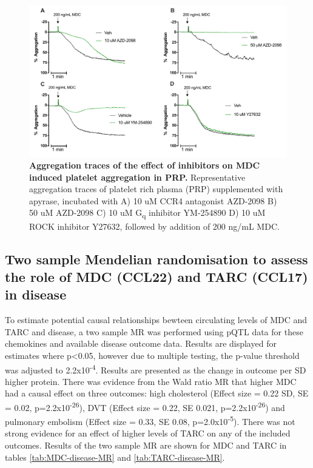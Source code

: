 \documentclass[11pt,twoside]{bristolthesis}
\begin{document}
\begin{figure}
\includegraphics[width=0.95\linewidth]{figure/Chemokines/Layouts/MDC_inhibitors_aggregation_traces} \caption[Aggregation traces of the effect of inhibitors on MDC induced platelet aggregation in PRP.]{\textbf{Aggregation traces of the effect of inhibitors on MDC induced platelet aggregation in PRP.} Representative aggregation traces of platelet rich plasma (PRP) supplemented with apyrase, incubated with A) 10 uM CCR4 antagonist AZD-2098 B) 50 uM AZD-2098 C) 10 uM G\textsubscript{q} inhibitor YM-254890 D) 10 uM ROCK inhibitor Y27632, followed by addition of 200 ng/mL MDC.}\label{fig:MDC-PRP-agg-trace}
\end{figure}
\hypertarget{two-sample-mendelian-randomisation-to-assess-the-role-of-mdc-ccl22-and-tarc-ccl17-in-disease}{%
\subsection{Two sample Mendelian randomisation to assess the role of MDC (CCL22) and TARC (CCL17) in disease}\label{two-sample-mendelian-randomisation-to-assess-the-role-of-mdc-ccl22-and-tarc-ccl17-in-disease}}

To estimate potential causal relationships bewteen circulating levels of MDC and TARC and disease, a two sample MR was performed using pQTL data for these chemokines and available disease outcome data. Results are displayed for estimates where p\textless0.05, however due to multiple testing, the p-value threshold was adjusted to 2.2x10\textsuperscript{-4}. Results are presented as the change in outcome per SD higher protein. There was evidence from the Wald ratio MR that higher MDC had a causal effect on three outcomes: high cholesterol (Effect size = 0.22 SD, SE = 0.02, p=2.2x10\textsuperscript{-26}), DVT (Effect size = 0.22, SE 0.021, p=2.2x10\textsuperscript{-26}) and pulmonary embolism (Effect size = 0.33, SE 0.08, p=2.0x10\textsuperscript{-5}). There was not strong evidence for an effect of higher levels of TARC on any of the included outcomes. Results of the two sample MR are shown for MDC and TARC in tables \ref{tab:MDC-disease-MR} and \ref{tab:TARC-disease-MR}.
\end{document}
